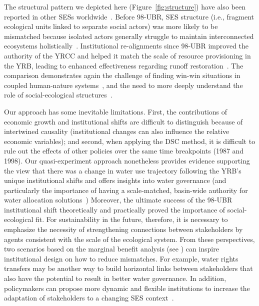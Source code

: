The structural pattern we depicted here (Figure~\ref{fig:structure}) have also been reported in other SESs worldwide~\cite{kluger2020,guerrero2015,bodin2012}.
Before 98-UBR, SES structure (i.e., fragment ecological units linked to separate social actors) was more likely to be mismatched because isolated actors generally struggle to maintain interconnected ecosystems holistically~\cite{sayles2017,sayles2019,cai2016,bergsten2019}.
Institutional re-alignments since 98-UBR improved the authority of the YRCC and helped it match the scale of resource provisioning in the YRB, leading to enhanced effectiveness regarding runoff restoration~\cite{cumming2020a,wang2019d}.
The comparison demonstrates again the challenge of finding win-win situations in coupled human-nature systems~\cite{hegwood2022}, and the need to more deeply understand the role of social-ecological structures~\cite{bergsten2019, sayles2019}.


Our approach has some inevitable limitations.
First, the contributions of economic growth and institutional shifts are difficult to distinguish because of intertwined causality (institutional changes can also influence the relative economic variables);
and second, when applying the DSC method, it is difficult to rule out the effects of other policies over the same time breakpoints (1987 and 1998).
Our quasi-experiment approach nonetheless provides evidence supporting the view that there was a change in water use trajectory following the YRB's unique institutional shifts and offers insights into water governance (and particularly the importance of having a scale-matched, basin-wide authority for water allocation solutions~\cite{bodin2017b, ostrom2009, reyers2018})
Moreover, the ultimate success of the 98-UBR institutional shift theoretically and practically proved the importance of social-ecological fit.
For sustainability in the future, therefore, it is necessary to emphasize the necessity of strengthening connections between stakeholders by agents consistent with the scale of the ecological system.
From these perspectives, two scenarios based on the marginal benefit analysis (see \textit{}) can inspire institutional design on how to reduce mismatches.
For example, water rights transfers may be another way to build horizontal links between stakeholders that also have the potential to result in better water governance.
In addition, policymakers can propose more dynamic and flexible institutions to increase the adaptation of stakeholders to a changing SES context~\cite{reyers2018}.

